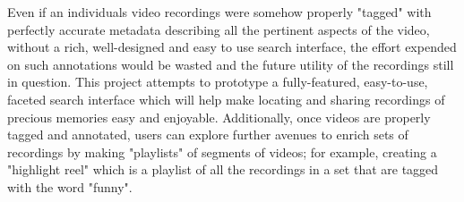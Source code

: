 Even if an individuals video recordings were somehow properly "tagged" with perfectly accurate metadata describing all the pertinent aspects of the video, without a rich, well-designed and easy to use search interface, the effort expended on such annotations would be wasted and the future utility of the recordings still in question.  This project attempts to prototype a fully-featured, easy-to-use, faceted search interface which will help make locating and sharing recordings of precious memories easy and enjoyable.  Additionally, once videos are properly tagged and annotated, users can explore further avenues to enrich sets of recordings by making "playlists" of segments of videos; for example, creating a "highlight reel" which is a playlist of all the recordings in a set that are tagged with the word "funny".



